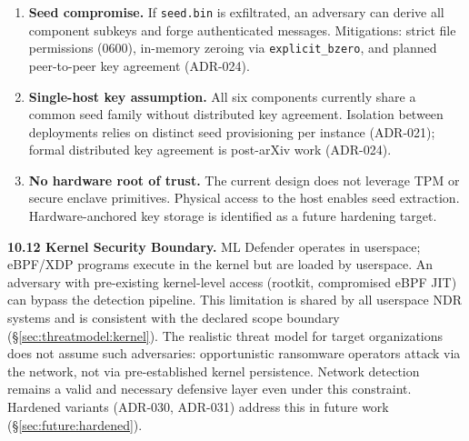 \documentclass[11pt,a4paper]{article}
\begin{document}
    \begin{enumerate}
        \item \textbf{Seed compromise.} If \texttt{seed.bin} is exfiltrated, an adversary
        can derive all component subkeys and forge authenticated messages. Mitigations:
        strict file permissions (0600), in-memory zeroing via \texttt{explicit\_bzero},
        and planned peer-to-peer key agreement (ADR-024).

        \item \textbf{Single-host key assumption.} All six components currently share a
        common seed family without distributed key agreement. Isolation between deployments
        relies on distinct seed provisioning per instance (ADR-021); formal distributed key
        agreement is post-arXiv work (ADR-024).

        \item \textbf{No hardware root of trust.} The current design does not leverage TPM
        or secure enclave primitives. Physical access to the host enables seed extraction.
        Hardware-anchored key storage is identified as a future hardening target.

    \end{enumerate}

    \textbf{10.12 Kernel Security Boundary.} ML Defender operates in userspace; eBPF/XDP
    programs execute in the kernel but are loaded by userspace. An adversary with
    pre-existing kernel-level access (rootkit, compromised eBPF JIT) can bypass the
    detection pipeline. This limitation is shared by all userspace NDR systems and is
    consistent with the declared scope boundary (\S\ref{sec:threatmodel:kernel}).
    The realistic threat model for target organizations does not assume such adversaries:
    opportunistic ransomware operators attack via the network, not via pre-established
    kernel persistence. Network detection remains a valid and necessary defensive layer
    even under this constraint. Hardened variants (ADR-030, ADR-031) address this in
    future work (\S\ref{sec:future:hardened}).
\end{document}
